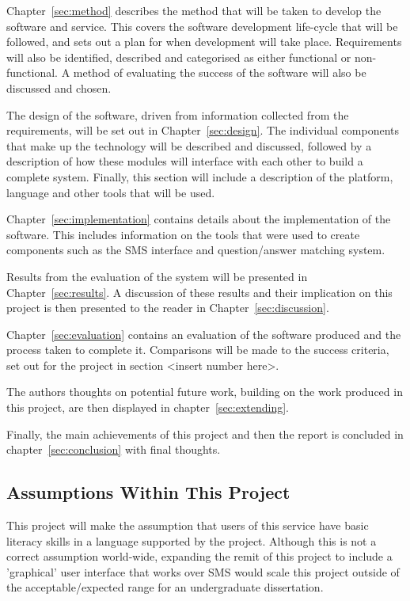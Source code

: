 \documentclass{article}
\begin{document}
Chapter~\ref{sec:method} describes the method that will be taken to develop the software and service.  This covers the software development life-cycle that will be followed, and sets out a plan for when development will take place.  Requirements will also be identified, described and categorised  as either functional or non-functional.  A method of evaluating the success of the software will also be discussed and chosen.

The design of the software, driven from information collected from the requirements, will be set out in Chapter~\ref{sec:design}.  The individual components that make up the technology will be described and discussed, followed by a description of how these modules will interface with each other to build a complete system.  Finally, this section will include a description of the platform, language and other tools that will be used.

Chapter~\ref{sec:implementation} contains details about the implementation of the software.  This includes information on the tools that were used to create components such as the SMS interface and question/answer matching system.

Results from the evaluation of the system will be presented in Chapter~\ref{sec:results}.  A discussion of these results and their implication on this project is then presented to the reader in Chapter~\ref{sec:discussion}.

Chapter~\ref{sec:evaluation} contains an evaluation of the software produced and the process taken to complete it.  Comparisons will be made to the success criteria, set out for the project in section <insert number here>.

The authors thoughts on potential future work, building on the work produced in this project, are then displayed in chapter~\ref{sec:extending}.  

Finally, the main achievements of this project and then the report is concluded in chapter~\ref{sec:conclusion} with final thoughts.


\subsection{Assumptions Within This Project}
This project will make the assumption that users of this service have basic literacy skills in a language supported by the project.  Although this is not a correct assumption world-wide, expanding the remit of this project to include a 'graphical' user interface that works over SMS would scale this project outside of the acceptable/expected range for an undergraduate dissertation.
\end{document}
